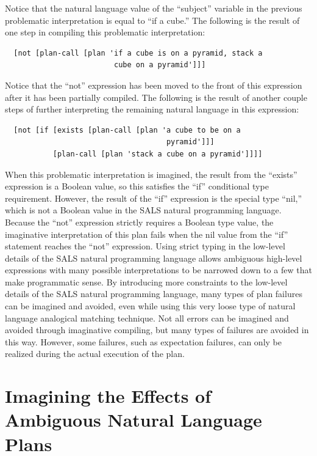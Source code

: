 Notice that the natural language value of the ``subject'' variable in
the previous problematic interpretation is equal to ``if a cube.''
The following is the result of one step in compiling this problematic
interpretation:
\begin{Verbatim}
  [not [plan-call [plan 'if a cube is on a pyramid, stack a
                         cube on a pyramid']]]
\end{Verbatim}
Notice that the ``not'' expression has been moved to the
front of this expression after it has been partially compiled.  The
following is the result of another couple steps of further
interpreting the remaining natural language in this expression:
\begin{Verbatim}
  [not [if [exists [plan-call [plan 'a cube to be on a
                                     pyramid']]]
           [plan-call [plan 'stack a cube on a pyramid']]]]
\end{Verbatim}
When this problematic interpretation is imagined, the result from the
``exists'' expression is a Boolean value, so this satisfies the ``if''
conditional type requirement.  However, the result of the ``if''
expression is the special type ``nil,'' which is not a Boolean value
in the SALS natural programming language.  Because the ``not''
expression strictly requires a Boolean type value, the imaginative
interpretation of this plan fails when the nil value from the ``if''
statement reaches the ``not'' expression.  Using strict typing in the
low-level details of the SALS natural programming language allows
ambiguous high-level expressions with many possible interpretations to
be narrowed down to a few that make programmatic sense.  By
introducing more constraints to the low-level details of the SALS
natural programming language, many types of plan failures can be
imagined and avoided, even while using this very loose type of natural
language analogical matching technique.  Not all errors can be
imagined and avoided through imaginative compiling, but many types of
failures are avoided in this way.  However, some failures, such as
expectation failures, can only be realized during the actual execution
of the plan.

\section{Imagining the Effects of Ambiguous Natural Language Plans}
\label{section:imagining_the_effects_of_ambiguous_natural_language_plans}

